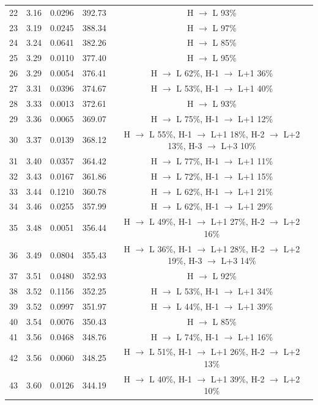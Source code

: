 \begin{table}[H]
{\begin{center}
\begin{tabular}{ccccc}
22 & 3.16 & 0.0296 & 392.73 & H $\rightarrow$ L 93\% \\
23 & 3.19 & 0.0245 & 388.34 & H $\rightarrow$ L 97\% \\
24 & 3.24 & 0.0641 & 382.26 & H $\rightarrow$ L 85\% \\
25 & 3.29 & 0.0110 & 377.40 & H $\rightarrow$ L 95\% \\
26 & 3.29 & 0.0054 & 376.41 & H $\rightarrow$ L 62\%, H-1 $\rightarrow$ L+1 36\% \\
27 & 3.31 & 0.0396 & 374.67 & H $\rightarrow$ L 53\%, H-1 $\rightarrow$ L+1 40\% \\
28 & 3.33 & 0.0013 & 372.61 & H $\rightarrow$ L 93\% \\
29 & 3.36 & 0.0065 & 369.07 & H $\rightarrow$ L 75\%, H-1 $\rightarrow$ L+1 12\% \\
30 & 3.37 & 0.0139 & 368.12 & H $\rightarrow$ L 55\%, H-1 $\rightarrow$ L+1 18\%, H-2 $\rightarrow$ L+2 13\%, H-3 $\rightarrow$ L+3 10\% \\
31 & 3.40 & 0.0357 & 364.42 & H $\rightarrow$ L 77\%, H-1 $\rightarrow$ L+1 11\% \\
32 & 3.43 & 0.0167 & 361.86 & H $\rightarrow$ L 72\%, H-1 $\rightarrow$ L+1 15\% \\
33 & 3.44 & 0.1210 & 360.78 & H $\rightarrow$ L 62\%, H-1 $\rightarrow$ L+1 21\% \\
34 & 3.46 & 0.0255 & 357.99 & H $\rightarrow$ L 62\%, H-1 $\rightarrow$ L+1 29\% \\
35 & 3.48 & 0.0051 & 356.44 & H $\rightarrow$ L 49\%, H-1 $\rightarrow$ L+1 27\%, H-2 $\rightarrow$ L+2 16\% \\
36 & 3.49 & 0.0804 & 355.43 & H $\rightarrow$ L 36\%, H-1 $\rightarrow$ L+1 28\%, H-2 $\rightarrow$ L+2 19\%, H-3 $\rightarrow$ L+3 14\% \\
37 & 3.51 & 0.0480 & 352.93 & H $\rightarrow$ L 92\% \\
38 & 3.52 & 0.1156 & 352.25 & H $\rightarrow$ L 53\%, H-1 $\rightarrow$ L+1 34\% \\
39 & 3.52 & 0.0997 & 351.97 & H $\rightarrow$ L 44\%, H-1 $\rightarrow$ L+1 39\% \\
40 & 3.54 & 0.0076 & 350.43 & H $\rightarrow$ L 85\% \\
41 & 3.56 & 0.0468 & 348.76 & H $\rightarrow$ L 74\%, H-1 $\rightarrow$ L+1 16\% \\
42 & 3.56 & 0.0060 & 348.25 & H $\rightarrow$ L 51\%, H-1 $\rightarrow$ L+1 26\%, H-2 $\rightarrow$ L+2 13\% \\
43 & 3.60 & 0.0126 & 344.19 & H $\rightarrow$ L 40\%, H-1 $\rightarrow$ L+1 39\%, H-2 $\rightarrow$ L+2 10\% \\

\end{tabular}
\end{center}}
\end{table}
